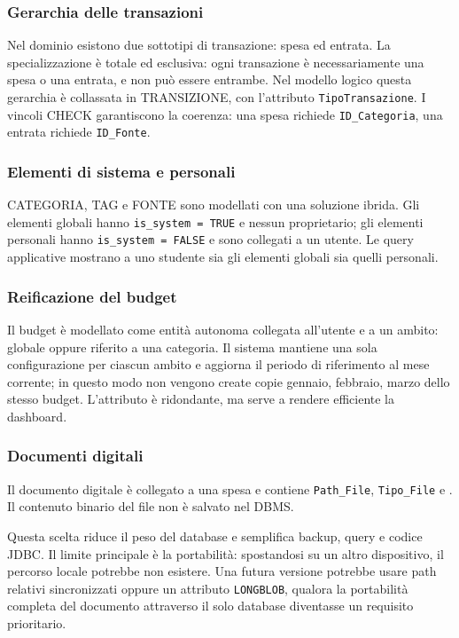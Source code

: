 \documentclass[11pt,a4paper]{article}
\begin{document}
\subsubsection{Gerarchia delle transazioni}
Nel dominio esistono due sottotipi di transazione: spesa ed entrata. La specializzazione è totale ed esclusiva: ogni transazione è necessariamente una spesa o una entrata, e non può essere entrambe. Nel modello logico questa gerarchia è collassata in \textsc{TRANSIZIONE}, con l'attributo \texttt{TipoTransazione}. I vincoli CHECK garantiscono la coerenza: una spesa richiede \texttt{ID\_Categoria}, una entrata richiede \texttt{ID\_Fonte}.

\subsubsection{Elementi di sistema e personali}
\textsc{CATEGORIA}, \textsc{TAG} e \textsc{FONTE} sono modellati con una soluzione ibrida. Gli elementi globali hanno \texttt{is\_system = TRUE} e nessun proprietario; gli elementi personali hanno \texttt{is\_system = FALSE} e sono collegati a un utente. Le query applicative mostrano a uno studente sia gli elementi globali sia quelli personali.

\subsubsection{Reificazione del budget}
Il budget è modellato come entità autonoma collegata all'utente e a un ambito: globale oppure riferito a una categoria. Il sistema mantiene una sola configurazione per ciascun ambito e aggiorna il periodo di riferimento al mese corrente; in questo modo non vengono create copie gennaio, febbraio, marzo dello stesso budget. L'attributo  è ridondante, ma serve a rendere efficiente la dashboard.

\subsubsection{Documenti digitali}
Il documento digitale è collegato a una spesa e contiene \texttt{Path\_File}, \texttt{Tipo\_File} e . Il contenuto binario del file non è salvato nel DBMS.

Questa scelta riduce il peso del database e semplifica backup, query e codice JDBC. Il limite principale è la portabilità: spostandosi su un altro dispositivo, il percorso locale potrebbe non esistere. Una futura versione potrebbe usare path relativi sincronizzati oppure un attributo \texttt{LONGBLOB}, qualora la portabilità completa del documento attraverso il solo database diventasse un requisito prioritario.
\end{document}
